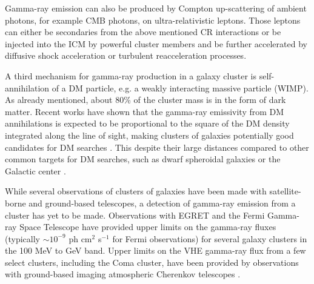 \documentclass[12pt,manuscript]{aastex}
\begin{document}
Gamma-ray emission can also be produced by Compton up-scattering of ambient photons, for example
CMB photons, on ultra-relativistic leptons. Those leptons can either be secondaries from the above
mentioned CR interactions or be injected into the ICM by powerful cluster members and be further
accelerated by diffusive shock acceleration or turbulent reacceleration processes.

A third mechanism for gamma-ray production in a galaxy cluster is self-annihilation of a DM
particle, e.g. a weakly interacting massive particle (WIMP). As already mentioned, about 80\% of
the cluster mass is in the form of dark matter. Recent works \citep{article:EvansFerrerSarkar:2004,
article:BergstromHooper:2006} have shown that the gamma-ray emissivity from DM annihilations is
expected to be proportional to the square of the DM density integrated along the line of sight,
making clusters of galaxies potentially good candidates for DM searches
\citep{article:PinzkePfrommerBergstrom2009, article:Cuesta_etal:2011}. This despite their large
distances compared to other common targets for DM searches, such as dwarf spheroidal galaxies
\citep{article:Strigari_etal:2007, article:Acciari_etal:2010,article:Aliu_etal:2009} or the
Galactic center \citep{article:Kosack_etal:2004, article:Aharonian_etal:2006,
article:Aharonian_etal:2009b}.

While several observations of clusters of galaxies have been made with satellite-borne and
ground-based telescopes, a detection of gamma-ray emission from a cluster has yet to be made.
Observations with EGRET \citep{article:Sreekumar_etal:1996, article:Reimer_etal:2003} and the Fermi
Gamma-ray Space Telescope \citep{article:Ackermann_etal:2010} have provided upper limits on the
gamma-ray fluxes (typically $\sim10^{-9}$ ph cm$^{2}$ s$^{-1}$ for Fermi observations) for several
galaxy clusters in the 100 MeV to GeV band. Upper limits on the VHE gamma-ray flux from a few
select clusters, including the Coma cluster, have been provided by observations with ground-based
imaging atmospheric Cherenkov telescopes \citep[IACTs;][]{article:Perkins_etal:2006,
inproc:Perkins_etal:2008, article:Aharonian_etal:2009a, article:Aleksic_etal:2010}.
\end{document}
